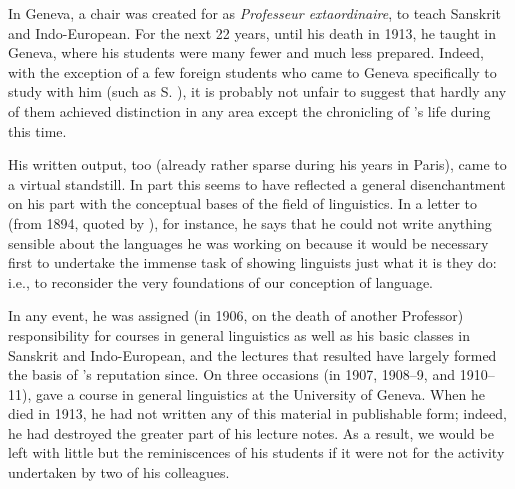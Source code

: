 In Geneva, a chair was created for {\Saussure} as \emph{Professeur
  extaordinaire}, to teach {Sanskrit} and {Indo-European}.  For the next
22 years, until his death in 1913, he taught in Geneva, where his
students were many fewer and much less prepared. Indeed, with the
exception of a few foreign students who came to Geneva specifically to
study with him (such as S. {\Karcevskij}), it is probably not unfair to
suggest that hardly any of them achieved distinction in any area
except the chronicling of {\Saussure}'s life during this time.

His written output, too (already rather sparse during his years in
Paris), came to a virtual standstill. In part this seems to have
reflected a general disenchantment on his part with the conceptual
bases of the field of linguistics.  In a letter to {\Meillet} (from 1894,
quoted by \citet[31]{godel57:sources}), for instance, he says that he
could not write anything sensible about the languages he was working
on because it would be necessary first to undertake the immense task
of showing linguists just what it is they do: i.e., to reconsider the
very foundations of our conception of language.  

In any event, he was assigned (in 1906, on the death of another
Professor) responsibility for courses in general linguistics as well
as his basic classes in {Sanskrit} and {Indo-European}, and the lectures
that resulted have largely formed the basis of {\Saussure}'s reputation
since. On three occasions (in 1907, 1908--9, and 1910--11), {\Saussure}
gave a course in general linguistics at the University of Geneva.
When he died in 1913, he had not written any of this material in
publishable form; indeed, he had destroyed the greater part of his
lecture notes.  As a result, we would be left with little but the
reminiscences of his students if it were not for the activity
undertaken by two of his colleagues.

